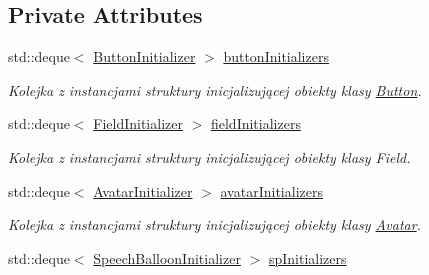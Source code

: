 \subsection*{Private Attributes}
\begin{DoxyCompactItemize}
\item 
\mbox{\label{class_settings_container_ae08f7b2d3eb77b083f4126c1bf7473a7}} 
std\+::deque$<$ \mbox{\hyperlink{struct_button_initializer}{Button\+Initializer}} $>$ \mbox{\hyperlink{class_settings_container_ae08f7b2d3eb77b083f4126c1bf7473a7}{button\+Initializers}}
\begin{DoxyCompactList}\small\item\em Kolejka z instancjami struktury inicjalizującej obiekty klasy \mbox{\hyperlink{class_button}{Button}}. \end{DoxyCompactList}\item 
\mbox{\label{class_settings_container_a217a71bbef72bf5ab42193fb321928b2}} 
std\+::deque$<$ \mbox{\hyperlink{struct_field_initializer}{Field\+Initializer}} $>$ \mbox{\hyperlink{class_settings_container_a217a71bbef72bf5ab42193fb321928b2}{field\+Initializers}}
\begin{DoxyCompactList}\small\item\em Kolejka z instancjami struktury inicjalizującej obiekty klasy Field. \end{DoxyCompactList}\item 
\mbox{\label{class_settings_container_a1751e5647ce983ba030a9ff277c1f747}} 
std\+::deque$<$ \mbox{\hyperlink{struct_avatar_initializer}{Avatar\+Initializer}} $>$ \mbox{\hyperlink{class_settings_container_a1751e5647ce983ba030a9ff277c1f747}{avatar\+Initializers}}
\begin{DoxyCompactList}\small\item\em Kolejka z instancjami struktury inicjalizującej obiekty klasy \mbox{\hyperlink{class_avatar}{Avatar}}. \end{DoxyCompactList}\item 
\mbox{\label{class_settings_container_a02c8549a776a2cf11fa05e5f64af428d}} 
std\+::deque$<$ \mbox{\hyperlink{struct_speech_balloon_initializer}{Speech\+Balloon\+Initializer}} $>$ \mbox{\hyperlink{class_settings_container_a02c8549a776a2cf11fa05e5f64af428d}{sp\+Initializers}}

\end{DoxyCompactItemize}
